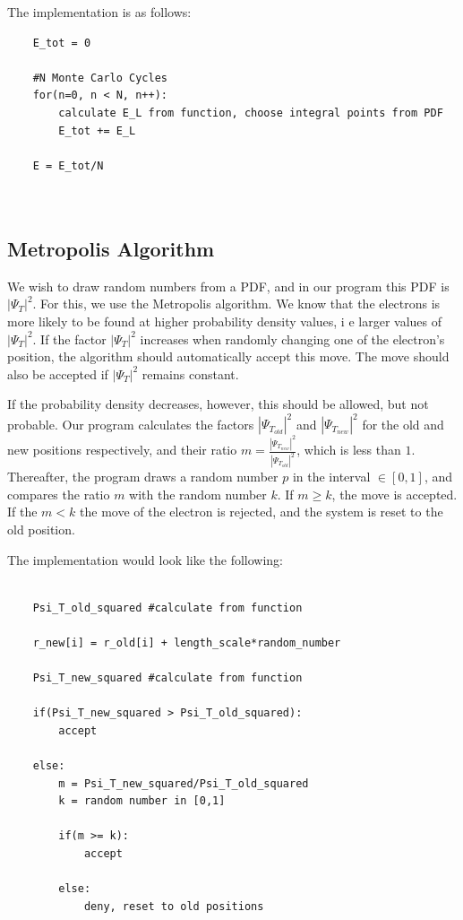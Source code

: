 \documentclass[norsk,a4paper,12pt]{article}
\begin{document}
The implementation is as follows:

\begin{lstlisting}
    E_tot = 0
    
    #N Monte Carlo Cycles
    for(n=0, n < N, n++):
        calculate E_L from function, choose integral points from PDF
        E_tot += E_L
        
    E = E_tot/N
        
    
\end{lstlisting}

\subsection{Metropolis Algorithm} \label{MetropolisAlgorithm}
We wish to draw random numbers from a PDF, and in our program this PDF is $|\Psi_T|^2$. For this, we use the Metropolis algorithm. We know that the electrons is more likely to be found at higher probability density values, i e larger values of $|\Psi_T|^2$. If the factor $|\Psi_T|^2$ increases when randomly changing one of the electron's position, the algorithm should automatically accept this move. The move should also be accepted if $|\Psi_T|^2$ remains constant.

\par 
\vspace{2mm}

If the probability density decreases, however, this should be allowed, but not probable. Our program calculates the factors $|\Psi_T_{old}|^2$ and $|\Psi_T_{new}|^2$ for the old and new positions respectively, and their ratio $ m = \frac{|\Psi_T_{new}|^2}{|\Psi_T_{old}|^2}$, which is less than $1$. Thereafter, the program draws a random number $p$ in the interval $\in [0, 1]$, and compares the ratio $m$ with the random number $k$. If $m \geq k$, the move is accepted. If the $m < k$ the move of the electron is rejected, and the system is reset to the old position. 

\par 
\vspace{3mm}

The implementation would look like the following:

\begin{lstlisting}
    
    Psi_T_old_squared #calculate from function
    
    r_new[i] = r_old[i] + length_scale*random_number
    
    Psi_T_new_squared #calculate from function
    
    if(Psi_T_new_squared > Psi_T_old_squared):
        accept
    
    else:
        m = Psi_T_new_squared/Psi_T_old_squared
        k = random number in [0,1]
        
        if(m >= k):
            accept
            
        else:
            deny, reset to old positions
    
    
    
    
\end{lstlisting}
\end{document}
